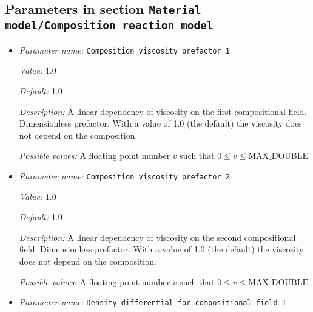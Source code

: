 \subsection{Parameters in section \tt Material model/Composition reaction model}
\label{parameters:Material_20model/Composition_20reaction_20model}

\begin{itemize}
\item {\it Parameter name:} {\tt Composition viscosity prefactor 1}
\label{parameters:Material model/Composition reaction model/Composition viscosity prefactor 1}
\label{parameters:Material_20model/Composition_20reaction_20model/Composition_20viscosity_20prefactor_201}


{\it Value:} 1.0


{\it Default:} 1.0


{\it Description:} A linear dependency of viscosity on the first compositional field. Dimensionless prefactor. With a value of 1.0 (the default) the viscosity does not depend on the composition.


{\it Possible values:} A floating point number $v$ such that $0 \leq v \leq \text{MAX\_DOUBLE}$
\item {\it Parameter name:} {\tt Composition viscosity prefactor 2}
\label{parameters:Material model/Composition reaction model/Composition viscosity prefactor 2}
\label{parameters:Material_20model/Composition_20reaction_20model/Composition_20viscosity_20prefactor_202}


{\it Value:} 1.0


{\it Default:} 1.0


{\it Description:} A linear dependency of viscosity on the second compositional field. Dimensionless prefactor. With a value of 1.0 (the default) the viscosity does not depend on the composition.


{\it Possible values:} A floating point number $v$ such that $0 \leq v \leq \text{MAX\_DOUBLE}$
\item {\it Parameter name:} {\tt Density differential for compositional field 1}
\label{parameters:Material model/Composition reaction model/Density differential for compositional field 1}
\label{parameters:Material_20model/Composition_20reaction_20model/Density_20differential_20for_20compositional_20field_201}



\end{itemize}
